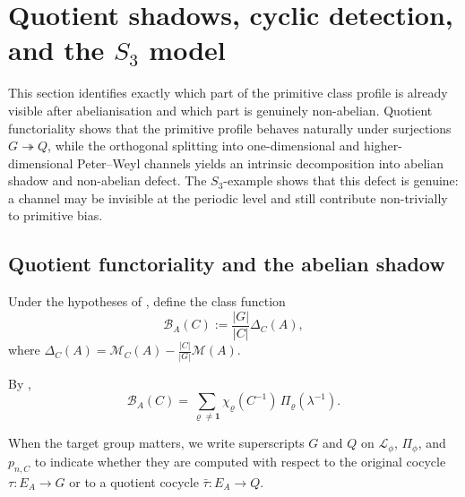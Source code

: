 \section[Quotient shadows, cyclic detection, and the S3 model]{Quotient shadows,
  cyclic detection, and the \texorpdfstring{$S_3$}{S3} model}
\label{sec:shadows}

This section identifies exactly which part of the primitive class
profile is already visible after abelianisation and which part is
genuinely non-abelian. Quotient functoriality shows that the primitive
profile behaves naturally under surjections \(G\twoheadrightarrow Q\),
while the orthogonal splitting into one-dimensional and
higher-dimensional Peter--Weyl channels yields an intrinsic
decomposition into abelian shadow and non-abelian defect. The
\(S_3\)-example shows that this defect is genuine: a channel may be
invisible at the periodic level and still contribute non-trivially to
primitive bias.

\subsection{Quotient functoriality and the abelian shadow}

\begin{definition}
  \label{def:normalised-primitive-class-profile}
  Under the hypotheses of , define the
  class function
  \[
    \mathcal B_A(C):=\frac{|G|}{|C|}\Delta_C(A),
  \]
  where \(\Delta_C(A)=\mathcal M_C(A)-\frac{|C|}{|G|}\mathcal M(A)\).
\end{definition}

By ,
\begin{equation}\label{eq:normalised-primitive-class-profile}
  \mathcal B_A(C)
  =
  \sum_{\varrho\neq \mathbf 1}
    \chi_\varrho(C^{-1})\,\Pi_\varrho(\lambda^{-1}).
\end{equation}

When the target group matters, we write superscripts \(G\) and \(Q\) on
\(\mathcal L_\phi\), \(\Pi_\phi\), and \(p_{n,C}\) to indicate whether
they are computed with respect to the original cocycle \(\tau:E_A\to G\)
or to a quotient cocycle \(\bar\tau:E_A\to Q\).

